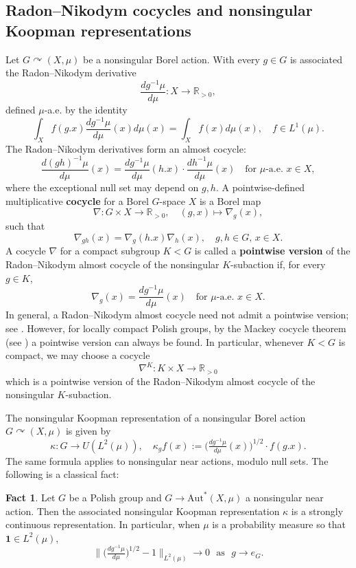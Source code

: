 \documentclass{amsart}
\numberwithin{equation}{subsection}
\theoremstyle{plain}
\theoremstyle{definition}
\newtheorem{fct}[fct]{Fact}
\theoremstyle{plain}
\begin{document}
\subsection{Radon--Nikodym cocycles and nonsingular Koopman representations}

Let \(G\curvearrowright\left(X,\mu\right)\) be a nonsingular Borel action. With every \(g\in G\) is associated the Radon--Nikodym derivative
\[\frac{dg^{-1}\mu}{d\mu}:X\to\mathbb{R}_{>0},\]
defined \(\mu\)-a.e. by the identity
\[\int_{X}f\left(g.x\right)\frac{dg^{-1}\mu}{d\mu}\left(x\right)d\mu\left(x\right)=\int_{X}f\left(x\right)d\mu\left(x\right),\quad f\in L^{1}\left(\mu\right).\]
The Radon--Nikodym derivatives form an almost cocycle:
\[\frac{d\left(gh\right)^{-1}\mu}{d\mu}\left(x\right)=\frac{dg^{-1}\mu}{d\mu}\left(h.x\right)\cdot\frac{dh^{-1}\mu}{d\mu}\left(x\right)\quad\text{for }\mu\text{-a.e. }x\in X,\]
where the exceptional null set may depend on \(g,h\). A pointwise-defined multiplicative {\bf cocycle} for a Borel \(G\)-space \(X\) is a Borel map
\[\nabla:G\times X\to\mathbb{R}_{>0},\quad\left(g,x\right)\mapsto\nabla_{g}\left(x\right),\]
such that
\[\nabla_{gh}\left(x\right)=\nabla_{g}\left(h.x\right)\nabla_{h}\left(x\right),\quad g,h\in G,\,x\in X.\]
A cocycle \(\nabla\) for a compact subgroup \(K<G\) is called a {\bf pointwise version} of the Radon--Nikodym almost cocycle of the nonsingular \(K\)-subaction if, for every \(g\in K\),
\[\nabla_{g}\left(x\right)=\frac{dg^{-1}\mu}{d\mu}\left(x\right)\quad\text{for }\mu\text{-a.e. }x\in X.\]
In general, a Radon--Nikodym almost cocycle need not admit a pointwise version; see \cite{becker2013cocycles}. However, for locally compact Polish groups, by the Mackey cocycle theorem (see \cite[Lem.~5.26, p.~179]{varadarajan1968geometry}) a pointwise version can always be found. In particular, whenever \(K<G\) is compact, we may choose a cocycle
\[\nabla^{K}:K\times X\to\mathbb{R}_{>0}\]
which is a pointwise version of the Radon--Nikodym almost cocycle of the nonsingular \(K\)-subaction.

\smallskip

The nonsingular Koopman representation of a nonsingular Borel action \(G\curvearrowright\left(X,\mu\right)\) is given by
\[\kappa:G\to U\left(L^{2}\left(\mu\right)\right),\quad\kappa_{g}f\left(x\right):=\Big(\tfrac{dg^{-1}\mu}{d\mu}\left(x\right)\Big)^{1/2}\cdot f\left(g.x\right).\]
The same formula applies to nonsingular near actions, modulo null sets. The following is a classical fact:

\begin{fct}\label{fct:koopmancont}
Let \(G\) be a Polish group and \(G\to\mathrm{Aut}^{\ast}\left(X,\mu\right)\) a nonsingular near action. Then the associated nonsingular Koopman representation \(\kappa\) is a strongly continuous representation. In particular, when \(\mu\) is a probability measure so that \(\mathbf{1}\in L^{2}\left(\mu\right)\),
\[\big\|\big(\tfrac{dg^{-1}\mu}{d\mu}\big)^{1/2}-1\big\|_{L^{2}\left(\mu\right)}\to0\,\,\text{ as }\,\,g\to e_{G}.\]
\end{fct}
\end{document}
